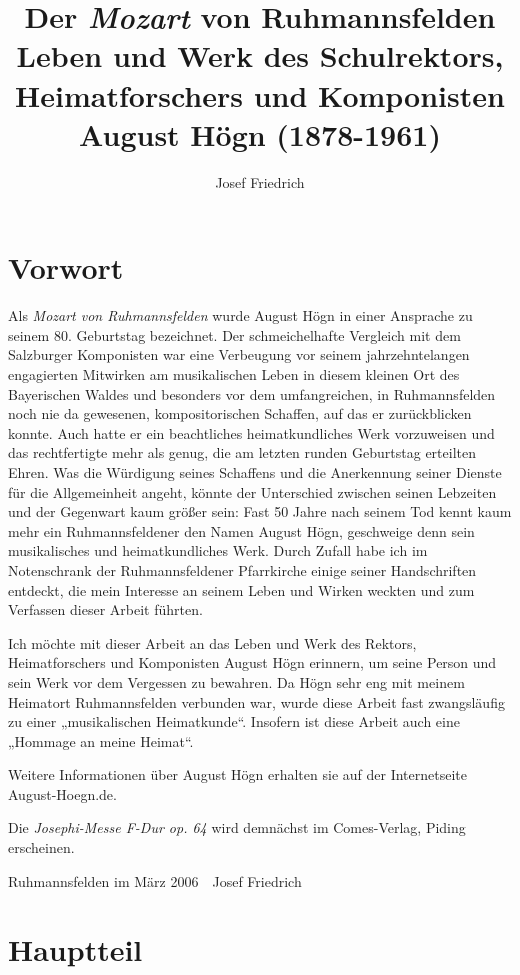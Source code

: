 \documentclass{book}
\title{%
 Der \textit{Mozart} von Ruhmannsfelden\newline%
 \large%
 Leben und Werk des Schulrektors, Heimatforschers
 und Komponisten August Högn (1878-1961)
}
\author{Josef Friedrich}
\begin{document}
\maketitle

\tableofcontents

\chapter{Vorwort}

Als \textit{Mozart von Ruhmannsfelden} wurde August Högn in einer
Ansprache zu seinem 80. Geburtstag bezeichnet. Der schmeichelhafte
Vergleich mit dem Salzburger Komponisten war eine Verbeugung vor seinem
jahrzehntelangen engagierten Mitwirken am musikalischen Leben in diesem
kleinen Ort des Bayerischen Waldes und besonders vor dem umfangreichen,
in Ruhmannsfelden noch nie da gewesenen, kompositorischen Schaffen, auf
das er zurückblicken konnte. Auch hatte er ein beachtliches
heimatkundliches Werk vorzuweisen und das rechtfertigte mehr als genug,
die am letzten runden Geburtstag erteilten Ehren. Was die Würdigung
seines Schaffens und die Anerkennung seiner Dienste für die
Allgemeinheit angeht, könnte der Unterschied zwischen seinen Lebzeiten
und der Gegenwart kaum größer sein: Fast 50 Jahre nach seinem Tod
kennt kaum mehr ein Ruhmannsfeldener den Namen August Högn, geschweige
denn sein musikalisches und heimatkundliches Werk. Durch Zufall habe
ich im Notenschrank der Ruhmannsfeldener Pfarrkirche einige seiner
Handschriften entdeckt, die mein Interesse an seinem Leben und Wirken
weckten und zum Verfassen dieser Arbeit führten.

Ich möchte mit dieser Arbeit an das Leben und Werk des Rektors,
Heimatforschers und Komponisten August Högn erinnern, um seine Person
und sein Werk vor dem Vergessen zu bewahren. Da Högn sehr eng mit
meinem Heimatort Ruhmannsfelden verbunden war, wurde diese Arbeit fast
zwangsläufig zu einer „musikalischen Heimatkunde“. Insofern ist diese
Arbeit auch eine „Hommage an meine Heimat“.

Weitere Informationen über August Högn erhalten sie auf der
Internetseite August-Hoegn.de.

Die \textit{Josephi-Messe F-Dur op. 64} wird demnächst im Comes-Verlag,
Piding erscheinen.

Ruhmannsfelden im März 2006\ \ Josef Friedrich

\chapter{Hauptteil}
\end{document}
